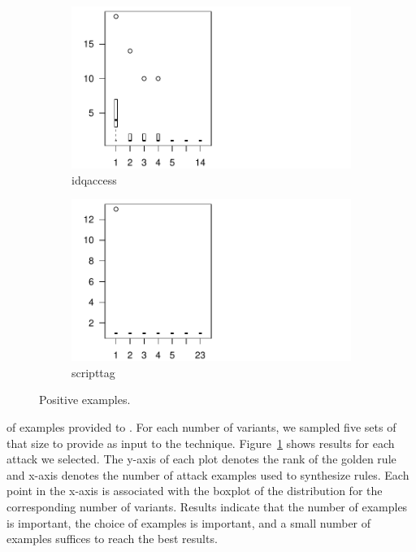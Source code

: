 \documentclass[conference]{IEEEtran}
\begin{document}
\begin{figure}  
  \vspace{-2ex}
  \centering
  \begin{subfigure}{.15\textwidth}
    \centering
    \includegraphics[scale=0.35,trim=10 0 130 0,clip]{R/idqaccess/idqaccess.pdf}
    \vspace{-3ex}
    \caption{idqaccess}
  \end{subfigure}%
  \begin{subfigure}{.15\textwidth}
    \centering
    \includegraphics[scale=0.35,trim=15 0 130 0,clip]{R/scripttag/scripttag.pdf}
    \vspace{-3ex}        
    \caption{scripttag}
  \end{subfigure}%
    \vspace{-1ex}          
  \caption{\label{fig:impact-number-attacks}Positive examples.}
  \vspace{-4ex}
\end{figure}
of examples provided to \tname. For each number of variants, we
sampled five sets of that size to provide as input to the technique.
Figure~\ref{fig:impact-number-attacks} shows results for each
attack we selected. The y-axis of each plot denotes the rank of the
golden rule and x-axis denotes the number of attack examples used to
synthesize rules. Each point in the x-axis is associated with the
boxplot of the distribution for the corresponding number of
variants. Results indicate that the number of examples is important,
the choice of examples is important, and a small number of examples
suffices to reach the best results.
\end{document}
